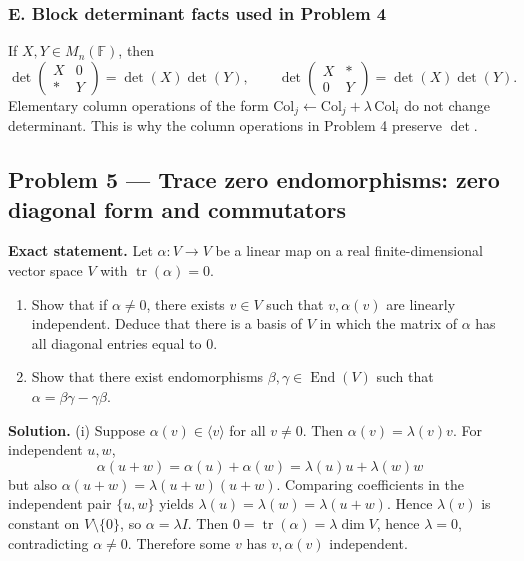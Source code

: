 \documentclass[12pt,a4paper]{article}
\theoremstyle{plain}
\theoremstyle{definition}      %
\begin{document}
\subsubsection*{E. Block determinant facts used in Problem 4}
If \(X,Y\in M_n(\mathbb F)\), then
\[
\det\begin{pmatrix}X&0\\ *&Y\end{pmatrix}=\det(X)\det(Y),
\qquad
\det\begin{pmatrix}X&*\\ 0&Y\end{pmatrix}=\det(X)\det(Y).
\]
Elementary column operations of the form \(\mathrm{Col}_j\leftarrow \mathrm{Col}_j+\lambda\,\mathrm{Col}_i\) do not change determinant.
This is why the column operations in Problem 4 preserve \(\det\).

\subsection*{Problem 5 — Trace zero endomorphisms: zero diagonal form and commutators}

\textbf{Exact statement.}
Let \(\alpha:V\to V\) be a linear map on a real finite-dimensional vector space \(V\) with \(\operatorname{tr}(\alpha)=0\).
\begin{enumerate}
	\item[(i)] Show that if \(\alpha\neq 0\), there exists \(v\in V\) such that \(v,\alpha(v)\) are linearly independent.
	Deduce that there is a basis of \(V\) in which the matrix of \(\alpha\) has all diagonal entries equal to \(0\).
	\item[(ii)] Show that there exist endomorphisms \(\beta,\gamma\in\operatorname{End}(V)\) such that \(\alpha=\beta\gamma-\gamma\beta\).
\end{enumerate}

\textbf{Solution.}
(i) Suppose \(\alpha(v)\in \langle v\rangle\) for all \(v\neq0\). Then \(\alpha(v)=\lambda(v)v\).
For independent \(u,w\),
\[
\alpha(u+w)=\alpha(u)+\alpha(w)=\lambda(u)u+\lambda(w)w
\]
but also \(\alpha(u+w)=\lambda(u+w)(u+w)\). Comparing coefficients in the independent pair \(\{u,w\}\) yields
\(\lambda(u)=\lambda(w)=\lambda(u+w)\). Hence \(\lambda(v)\) is constant on \(V\setminus\{0\}\), so \(\alpha=\lambda I\).
Then \(0=\operatorname{tr}(\alpha)=\lambda\dim V\), hence \(\lambda=0\), contradicting \(\alpha\neq0\). Therefore some \(v\) has
\(v,\alpha(v)\) independent.
\end{document}
